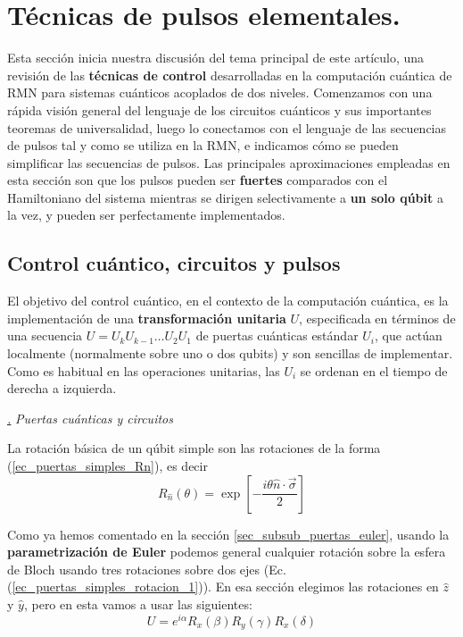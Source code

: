 \documentclass[a4paper,11pt]{book} %
\numberwithin{equation}{chapter}
\def\lc{\left[}
\def\rc{\right]}
\def\subsubiContadorIt{\par\addtocounter{subsubsection}{1}\underline{\it\thesubsubsection.}\hskip0.5cm \setcounter{subsubsubsectionIt}{0}}
\newcommand{\SubsubiIt}[1]{
		\subsubiContadorIt \textit{#1}
	}
\newcounter{subsubsubsectionIt}[subsubsection]
\begin{document}
	\section{Técnicas de pulsos elementales.} \label{sec_sub_Harware_NMR_pulsos} 

Esta sección inicia nuestra discusión del tema principal de este artículo, una revisión de las \textbf{técnicas de control} desarrolladas en la computación cuántica de RMN para sistemas cuánticos acoplados de dos niveles. Comenzamos con una rápida visión general del lenguaje de los circuitos cuánticos y sus importantes teoremas de universalidad, luego lo conectamos con el lenguaje de las secuencias de pulsos tal y como se utiliza en la RMN, e indicamos cómo se pueden simplificar las secuencias de pulsos. Las principales aproximaciones empleadas en esta sección son que los pulsos pueden ser \textbf{fuertes} comparados con el Hamiltoniano del sistema mientras se dirigen selectivamente a \textbf{un solo qúbit} a la vez, y pueden ser perfectamente implementados. 

		\subsection{Control cuántico, circuitos y pulsos}

El objetivo del control cuántico, en el contexto de la computación cuántica, es la implementación de una \textbf{transformación unitaria} $U$, especificada en términos de una secuencia $U = U_k U_{k-1} \dots U_2 U_1$ de puertas cuánticas estándar $U_i$, que actúan localmente (normalmente sobre uno o dos qubits) y son sencillas de implementar. Como es habitual en las operaciones unitarias, las $U_i$ se ordenan en el tiempo de derecha a izquierda.

			\SubsubiIt{Puertas cuánticas y circuitos}

La rotación básica de un qúbit simple son las rotaciones de la forma (\ref{ec_puertas_simples_Rn}), es decir
\begin{equation}
R_{\hat{n}} (\theta) = \exp \lc - \frac{i \theta \hat{n} \cdot \vec{\sigma}}{2} \rc
\end{equation}

Como ya hemos comentado en la sección \ref{sec_subsub_puertas_euler}, usando la \textbf{parametrización de Euler}  podemos general cualquier rotación sobre la esfera de Bloch usando tres rotaciones sobre dos ejes (Ec. (\ref{ec_puertas_simples_rotacion_1})). En esa sección elegimos las rotaciones en $\hat{z}$ y $\hat{y}$, pero en esta vamos a usar las siguientes:
	\begin{equation}
	U = e^{i \alpha} R_x(\beta) R_y (\gamma) R_x (\delta)
	\end{equation}
\end{document}
